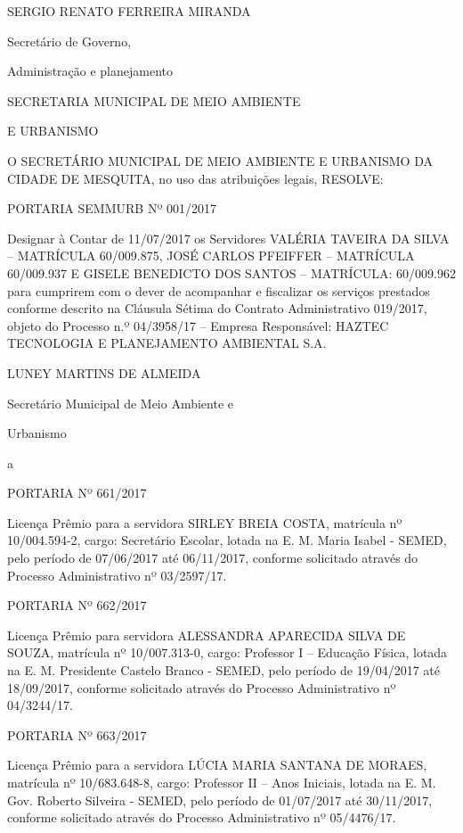 \documentclass{doliberto}
\begin{document}
SERGIO RENATO FERREIRA MIRANDA 

Secretário de Governo, 

 Administração e planejamento 

SECRETARIA MUNICIPAL DE MEIO AMBIENTE 

E URBANISMO 

 
O SECRETÁRIO MUNICIPAL DE MEIO 
AMBIENTE E URBANISMO DA CIDADE DE 
MESQUITA, no uso das atribuições legais, 
RESOLVE: 
 
PORTARIA SEMMURB Nº 001/2017 
 
Designar  à  Contar  de  11/07/2017  os  Servidores 
VALÉRIA TAVEIRA DA SILVA – MATRÍCULA 60/009.875, 
JOSÉ  CARLOS  PFEIFFER  –  MATRÍCULA  60/009.937  E 
GISELE  BENEDICTO  DOS  SANTOS  –  MATRÍCULA: 
60/009.962  para cumprirem com o dever de acompanhar 
e  fiscalizar  os  serviços  prestados  conforme  descrito  na 
Cláusula Sétima do Contrato Administrativo 019/2017, 
objeto  do  Processo  n.º  04/3958/17  –  Empresa 
Responsável:  HAZTEC  TECNOLOGIA  E  PLANEJAMENTO 
AMBIENTAL S.A. 

 

LUNEY MARTINS DE ALMEIDA 

Secretário Municipal de Meio Ambiente e 

Urbanismo 

 

a 

 
PORTARIA Nº 661/2017 
 
Licença  Prêmio  para  a  servidora  SIRLEY  BREIA  COSTA, 
matrícula  nº  10/004.594-2,  cargo:  Secretário  Escolar, 
lotada  na  E.  M.  Maria  Isabel  -  SEMED,  pelo  período  de 
07/06/2017  até  06/11/2017,  conforme  solicitado  através 
do Processo Administrativo nº 03/2597/17. 
 
PORTARIA Nº 662/2017 
 
Licença  Prêmio  para 
servidora  ALESSANDRA 
APARECIDA SILVA DE SOUZA, matrícula nº 10/007.313-0, 
cargo:  Professor  I  –  Educação  Física,  lotada  na  E.  M. 
Presidente  Castelo  Branco  -  SEMED,  pelo  período  de 
19/04/2017  até  18/09/2017,  conforme  solicitado  através 
do Processo Administrativo nº 04/3244/17. 
 
PORTARIA Nº 663/2017 
 
Licença Prêmio para a servidora  LÚCIA MARIA SANTANA 
DE  MORAES,  matrícula  nº  10/683.648-8,  cargo:  Professor 
II  –  Anos  Iniciais,  lotada  na  E.  M.  Gov.  Roberto  Silveira  - 
SEMED,  pelo  período  de  01/07/2017  até  30/11/2017, 
conforme solicitado através do Processo Administrativo nº 
05/4476/17. 
 
\end{document}
